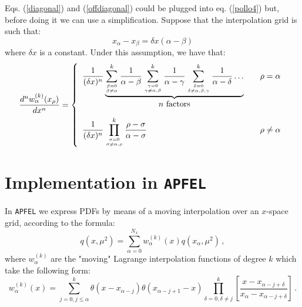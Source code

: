 \documentclass[10pt,a4paper]{article}
\begin{document}
Eqs. (\ref{diagonal}) and (\ref{offdiagonal}) could be plugged into
eq. (\ref{pollo4}) but, before doing it we can use a
simplification. Suppose that the interpolation grid is such that:
\begin{equation}
x_\alpha - x_\beta = \delta x(\alpha-\beta)
\end{equation}
where $\delta x$ is a constant. Under this assumption, we have that:
\begin{equation}
\frac{d^n w_\alpha^{(k)}(x_\rho)}{dx^n} =
\left\{
\begin{array}{ll}
\displaystyle \frac1{(\delta x)^n}\underbrace{\sum_{\beta=0\atop \beta\neq\alpha}^k\frac{1}{\alpha-\beta}
\sum_{\gamma=0\atop \gamma\neq\alpha,\beta}^k\frac{1}{\alpha-\gamma}
\sum_{\delta=0\atop \delta\neq\alpha,\beta,\gamma}^k\frac{1}{\alpha-\delta}
\dots}_{\mbox{$n$ factors}}  & \quad \rho = \alpha \\
\\
\displaystyle \frac{1}{(\delta x)^n}
\prod_{\sigma=0\atop\sigma\neq\alpha,\rho}^k\frac{\rho - \sigma}{\alpha-\sigma}  & \quad \rho \neq \alpha
\end{array}
\right.
\end{equation}


\section{Implementation in {\tt APFEL}}

In {\tt APFEL} we express PDFs by means of a moving interpolation over
an $x$-space grid, according to the formula:
\begin{equation}
{q}(x,\mu^2)=\sum^{N_{x}}_{\alpha=0}w_{\alpha}^{(k)}(x){q}(x_{\alpha},\mu^2)\,,
\end{equation}
where $w_{\alpha}^{(k)}$ are the "moving" Lagrange interpolation
functions of degree $k$ which take the following form:
\begin{equation}\label{LagrangeFormula}
w_{\alpha}^{(k)}(x) = \sum_{j=0,j \leq \alpha}^{k}\theta(x-x_{\alpha-j})\theta(x_{\alpha-j+1}-x)\prod^{k}_{\delta=0,\delta\ne j}\left[\frac{x-x_{\alpha-j+\delta}}{x_{\alpha}-x_{\alpha-j+\delta}}\right]\,.
\end{equation}
\end{document}
